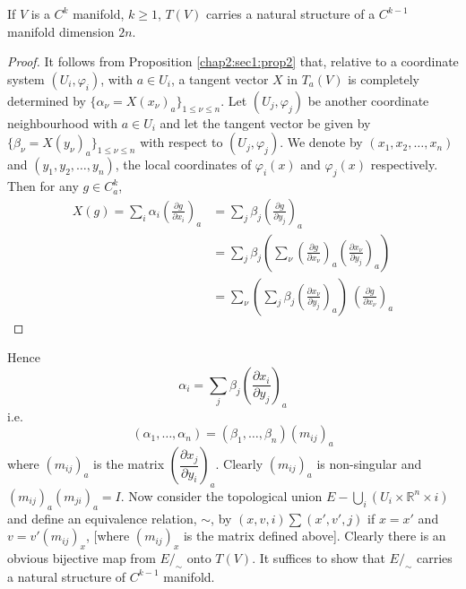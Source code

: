 \setcounter{theorem}{0}
\begin{theorem}\label{chap2:sec1:thm1} %
  If $V$ is a $C^k$ manifold, $k \ge 1$, $T(V)$ carries a
  natural structure of a $C^{k-1}$ manifold dimension $2n$. 
\end{theorem}

\begin{proof}
  It follows from Proposition \ref{chap2:sec1:prop2} that, relative to
  a coordinate 
  system $(U_i, \varphi_i)$, with $a \in U_i$, a tangent vector $X$ in
  $T_a(V)$ is completely determined by $\{\alpha_\nu = X(x_\nu)_a \}_{1
    \le \nu \le n}$. Let $(U_j, \varphi_j)$ be another coordinate
  neighbourhood with $a \in U_i$ and let the tangent vector be given
  by $\{\beta _\nu = X (y_\nu)_a \}_{1 \leq \nu \leq n}$ with respect to $(U_j,
  \varphi_j)$. We denote by $(x_1, x_2, \ldots , x_n)$ and $(y_1, y_2,
  \ldots , y_n)$, the local coordinates of $\varphi_i (x)$ and
  $\varphi_j (x)$ respectively. Then for any $g \in C^k_a$, 
\begin{align*}
  X(g) = \sum_{i} \alpha_i \left(\frac{\partial g}{\partial x_i}\right)_a  &=
  \sum_j \beta_j \left(\frac{\partial g}{\partial y_j}\right)_a \\ 
  &= \sum_{j}\beta_j \left(\sum_\nu \left(\frac {\partial g}{\partial
    x_\nu}\right)_a \left( \frac{\partial x_\nu}{\partial
    y_j}\right)_a\right) \\  
  &= \sum_\nu \left( \sum_j \beta_j \left( \frac{\partial x_\nu}{\partial
    y_j}\right)_a \right) ~\left(\frac{\partial g}{\partial x_\nu}\right)_a 
\end{align*}
\end{proof}

Hence\pageoriginale 
\begin{equation*}
  \alpha_i = \sum_j \beta_j \left(\frac{\partial x_i}{\partial y_j}\right)_a
  \tag{1.1}\label{chap2:sec1:eq1.1}
\end{equation*}
i.e. 
\begin{equation*} 
  (\alpha_1,  \ldots , \alpha_n)= ( \beta_1 ,
  \ldots , \beta_n) (m_{ij})_a
\end{equation*}
where $(m_{ij})_a$ is the matrix $(\dfrac{ \partial x_j}{\partial
  y_i})_a$. Clearly $(m_{ij})_a$ is non-singular and $(m_{ij})_a
(m_{ji})_a = I$. Now consider the topological union $E- \bigcup_i (U_i
\times \mathbb{R}^n \times i)$ and define an equivalence relation,
$\sim$, by $(x, v, i) \sum (x', v', j)$ if $x=x'$ and $v
=v'(m_{ij})_x$, [where $(m_{ij})_x$ is the matrix defined
  above]. Clearly there is an obvious bijective map from $E/_\sim$
onto $T(V)$. It suffices to show that $E/_\sim$ carries a natural
structure of $C^{k-1}$ manifold. 

